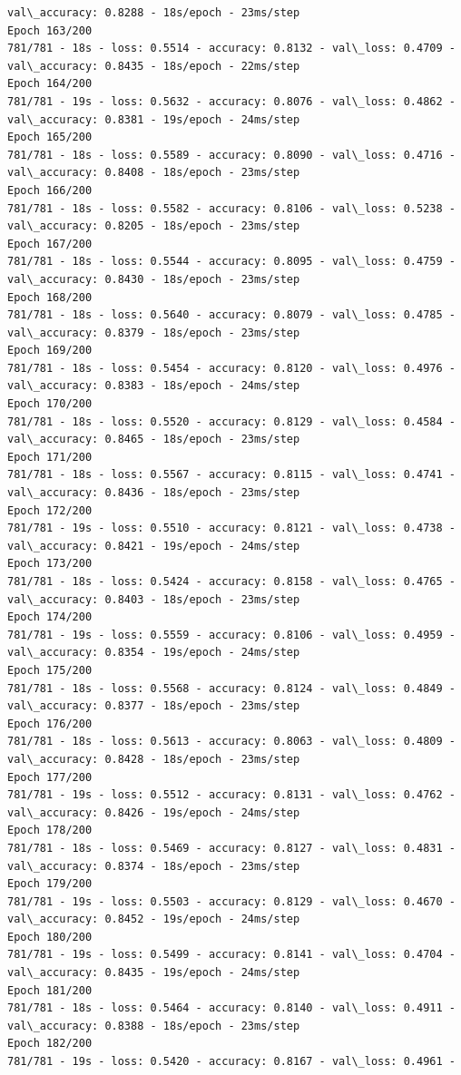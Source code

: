\documentclass[11pt]{article}
\begin{document}
\begin{Verbatim}[commandchars=\\\{\}]
val\_accuracy: 0.8288 - 18s/epoch - 23ms/step
Epoch 163/200
781/781 - 18s - loss: 0.5514 - accuracy: 0.8132 - val\_loss: 0.4709 -
val\_accuracy: 0.8435 - 18s/epoch - 22ms/step
Epoch 164/200
781/781 - 19s - loss: 0.5632 - accuracy: 0.8076 - val\_loss: 0.4862 -
val\_accuracy: 0.8381 - 19s/epoch - 24ms/step
Epoch 165/200
781/781 - 18s - loss: 0.5589 - accuracy: 0.8090 - val\_loss: 0.4716 -
val\_accuracy: 0.8408 - 18s/epoch - 23ms/step
Epoch 166/200
781/781 - 18s - loss: 0.5582 - accuracy: 0.8106 - val\_loss: 0.5238 -
val\_accuracy: 0.8205 - 18s/epoch - 23ms/step
Epoch 167/200
781/781 - 18s - loss: 0.5544 - accuracy: 0.8095 - val\_loss: 0.4759 -
val\_accuracy: 0.8430 - 18s/epoch - 23ms/step
Epoch 168/200
781/781 - 18s - loss: 0.5640 - accuracy: 0.8079 - val\_loss: 0.4785 -
val\_accuracy: 0.8379 - 18s/epoch - 23ms/step
Epoch 169/200
781/781 - 18s - loss: 0.5454 - accuracy: 0.8120 - val\_loss: 0.4976 -
val\_accuracy: 0.8383 - 18s/epoch - 24ms/step
Epoch 170/200
781/781 - 18s - loss: 0.5520 - accuracy: 0.8129 - val\_loss: 0.4584 -
val\_accuracy: 0.8465 - 18s/epoch - 23ms/step
Epoch 171/200
781/781 - 18s - loss: 0.5567 - accuracy: 0.8115 - val\_loss: 0.4741 -
val\_accuracy: 0.8436 - 18s/epoch - 23ms/step
Epoch 172/200
781/781 - 19s - loss: 0.5510 - accuracy: 0.8121 - val\_loss: 0.4738 -
val\_accuracy: 0.8421 - 19s/epoch - 24ms/step
Epoch 173/200
781/781 - 18s - loss: 0.5424 - accuracy: 0.8158 - val\_loss: 0.4765 -
val\_accuracy: 0.8403 - 18s/epoch - 23ms/step
Epoch 174/200
781/781 - 19s - loss: 0.5559 - accuracy: 0.8106 - val\_loss: 0.4959 -
val\_accuracy: 0.8354 - 19s/epoch - 24ms/step
Epoch 175/200
781/781 - 18s - loss: 0.5568 - accuracy: 0.8124 - val\_loss: 0.4849 -
val\_accuracy: 0.8377 - 18s/epoch - 23ms/step
Epoch 176/200
781/781 - 18s - loss: 0.5613 - accuracy: 0.8063 - val\_loss: 0.4809 -
val\_accuracy: 0.8428 - 18s/epoch - 23ms/step
Epoch 177/200
781/781 - 19s - loss: 0.5512 - accuracy: 0.8131 - val\_loss: 0.4762 -
val\_accuracy: 0.8426 - 19s/epoch - 24ms/step
Epoch 178/200
781/781 - 18s - loss: 0.5469 - accuracy: 0.8127 - val\_loss: 0.4831 -
val\_accuracy: 0.8374 - 18s/epoch - 23ms/step
Epoch 179/200
781/781 - 19s - loss: 0.5503 - accuracy: 0.8129 - val\_loss: 0.4670 -
val\_accuracy: 0.8452 - 19s/epoch - 24ms/step
Epoch 180/200
781/781 - 19s - loss: 0.5499 - accuracy: 0.8141 - val\_loss: 0.4704 -
val\_accuracy: 0.8435 - 19s/epoch - 24ms/step
Epoch 181/200
781/781 - 18s - loss: 0.5464 - accuracy: 0.8140 - val\_loss: 0.4911 -
val\_accuracy: 0.8388 - 18s/epoch - 23ms/step
Epoch 182/200
781/781 - 19s - loss: 0.5420 - accuracy: 0.8167 - val\_loss: 0.4961 -

\end{Verbatim}
\end{document}
